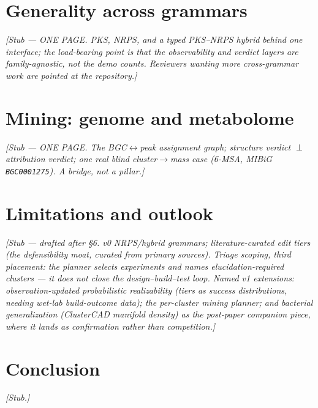 \documentclass[11pt]{article}
\newcommand{\code}[1]{\texttt{#1}}
\begin{document}


\section{Generality across grammars}\label{sec:generality}
\textit{[Stub --- ONE PAGE. PKS, NRPS, and a typed PKS--NRPS hybrid behind one interface; the
load-bearing point is that the observability and verdict layers are family-agnostic, not the demo
counts. Reviewers wanting more cross-grammar work are pointed at the repository.]}

\section{Mining: genome and metabolome}\label{sec:mining}
\textit{[Stub --- ONE PAGE. The BGC$\leftrightarrow$peak assignment graph; structure verdict
$\perp$ attribution verdict; one real blind cluster$\to$mass case (6-MSA, MIBiG \code{BGC0001275}). A
bridge, not a pillar.]}



\section{Limitations and outlook}\label{sec:limits}
\textit{[Stub --- drafted after \S6. v0 NRPS/hybrid grammars; literature-curated edit tiers (the
defensibility moat, curated from primary sources). \emph{Triage scoping, third placement:} the planner
selects experiments and names elucidation-required clusters --- it does not close the design--build--test
loop. Named v1 extensions: observation-updated \emph{probabilistic realizability} (tiers as success
distributions, needing wet-lab build-outcome data); the per-cluster mining planner; and
\emph{bacterial generalization} (ClusterCAD manifold density) as the post-paper companion piece, where
it lands as confirmation rather than competition.]}

\section{Conclusion}\label{sec:conclusion}
\textit{[Stub.]}
\end{document}
